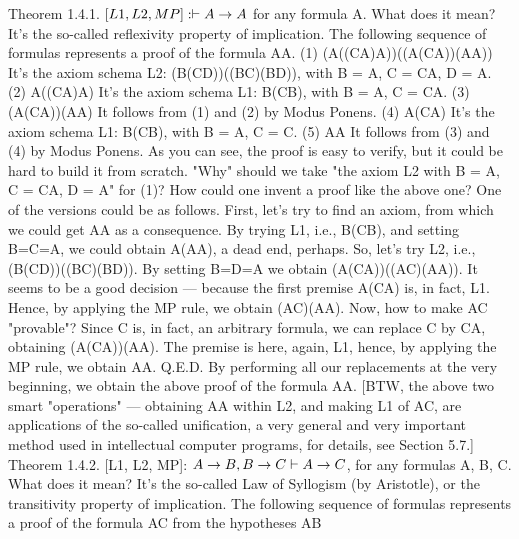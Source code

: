 Theorem 1.4.1. \([L1, L2, MP]: \vdash A\rightarrow A\) for any formula A. What does it mean? It's the so-called
reflexivity property of implication.
The following sequence of formulas represents a proof of the formula A\IMPLIES A.
(1) (A\IMPLIES ((C\IMPLIES A)\IMPLIES A))\IMPLIES ((A\IMPLIES (C\IMPLIES A))\IMPLIES (A\IMPLIES A)) It's the axiom schema L2: (B\IMPLIES (C\IMPLIES D))\IMPLIES ((B\IMPLIES C)\IMPLIES (B\IMPLIES D)), with B = A, C = C\IMPLIES A, D = A.  (2) A\IMPLIES ((C\IMPLIES A)\IMPLIES A) It's the axiom schema L1: B\IMPLIES (C\IMPLIES B), with B = A, C = C\IMPLIES A.  (3) (A\IMPLIES (C\IMPLIES A))\IMPLIES (A\IMPLIES A) It follows from (1) and (2) by Modus Ponens.  (4) A\IMPLIES (C\IMPLIES A) It's the axiom schema L1: B\IMPLIES (C\IMPLIES B), with B = A, C = C.  (5) A\IMPLIES A It follows from (3) and (4) by Modus Ponens.
As you can see, the proof is easy to verify, but it could be hard to build it from scratch. "Why" should we
take "the axiom L2 with B = A, C = C\IMPLIES A, D = A" for (1)?
How could one invent a proof like the above one? One of the versions could be as follows. First, let's try to find an axiom,
from which we could get A\IMPLIES A as a consequence. By trying L1, i.e., B\IMPLIES (C\IMPLIES B), and setting B=C=A, we could obtain
A\IMPLIES (A\IMPLIES A), a dead end, perhaps. So, let's try L2, i.e., (B\IMPLIES (C\IMPLIES D))\IMPLIES ((B\IMPLIES C)\IMPLIES (B\IMPLIES D)). By setting B=D=A we obtain
(A\IMPLIES (C\IMPLIES A))\IMPLIES ((A\IMPLIES C)\IMPLIES (A\IMPLIES A)). It seems to be a good decision --- because the first premise A\IMPLIES (C\IMPLIES A) is, in fact, L1.
Hence, by applying the MP rule, we obtain (A\IMPLIES C)\IMPLIES (A\IMPLIES A). Now, how to make A\IMPLIES C "provable"? Since C is, in fact, an
arbitrary formula, we can replace C by C\IMPLIES A, obtaining (A\IMPLIES (C\IMPLIES A))\IMPLIES (A\IMPLIES A). The premise is here, again, L1, hence, by
applying the MP rule, we obtain A\IMPLIES A. Q.E.D. By performing all our replacements at the very beginning, we obtain the above
proof of the formula A\IMPLIES A. [BTW, the above two smart "operations" --- obtaining A\IMPLIES A within L2, and making L1 of A\IMPLIES C,
are applications of the so-called unification, a very general and very important method used in intellectual computer programs,
for details, see Section 5.7.]
Theorem 1.4.2. [L1, L2, MP]: \(A\rightarrow B, B\rightarrow C \vdash A\rightarrow C\), for any formulas A, B, C. What does it mean? It's
the so-called Law of Syllogism (by Aristotle), or the transitivity property of implication.
The following sequence of formulas represents a proof of the formula A\IMPLIES C from the hypotheses A\IMPLIES B

